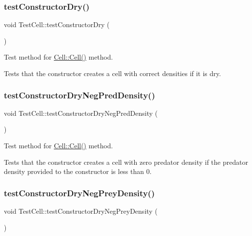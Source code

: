 \subsubsection{\texorpdfstring{test\+Constructor\+Dry()}{testConstructorDry()}}
{\footnotesize\ttfamily void Test\+Cell\+::test\+Constructor\+Dry (\begin{DoxyParamCaption}{ }\end{DoxyParamCaption})\hspace{0.3cm}{\ttfamily [protected]}}



Test method for \hyperlink{class_cell_afc0a4cece64b7689425fa81a4f6ef2e2}{Cell\+::\+Cell()} method. 

Tests that the constructor creates a cell with correct densities if it is dry. \mbox{\label{class_test_cell_a3c7de5784989a8b9c2f78f88aed24c52}} 
\subsubsection{\texorpdfstring{test\+Constructor\+Dry\+Neg\+Pred\+Density()}{testConstructorDryNegPredDensity()}}
{\footnotesize\ttfamily void Test\+Cell\+::test\+Constructor\+Dry\+Neg\+Pred\+Density (\begin{DoxyParamCaption}{ }\end{DoxyParamCaption})\hspace{0.3cm}{\ttfamily [protected]}}



Test method for \hyperlink{class_cell_afc0a4cece64b7689425fa81a4f6ef2e2}{Cell\+::\+Cell()} method. 

Tests that the constructor creates a cell with zero predator density if the predator density provided to the constructor is less than 0. \mbox{\label{class_test_cell_adcbb2fc8a03dddd8366643f59fdb963c}} 
\subsubsection{\texorpdfstring{test\+Constructor\+Dry\+Neg\+Prey\+Density()}{testConstructorDryNegPreyDensity()}}
{\footnotesize\ttfamily void Test\+Cell\+::test\+Constructor\+Dry\+Neg\+Prey\+Density (\begin{DoxyParamCaption}{ }\end{DoxyParamCaption})\hspace{0.3cm}{\ttfamily [protected]}}



